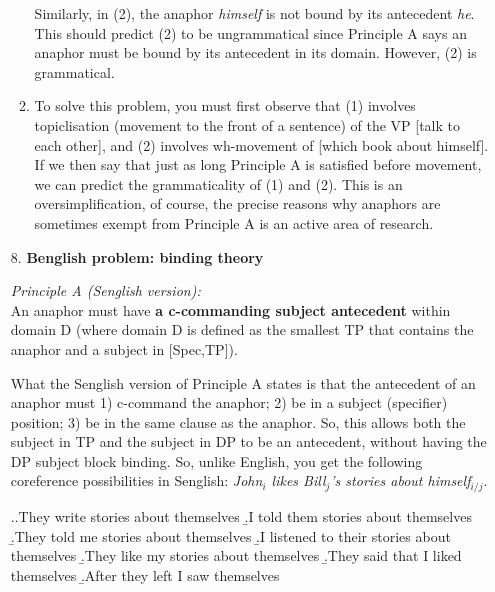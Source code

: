 \documentclass[a4paper,12pt]{article}
\begin{document}
\begin{enumerate}
\begin{enumerate}[label=(\roman*)]
        Similarly, in (2), the anaphor \textit{himself} is not bound by its antecedent \textit{he}. This should predict (2) to be ungrammatical since Principle A says an anaphor must be bound by its antecedent in its domain. However, (2) is grammatical.

        \item To solve this problem, you must first observe that (1) involves topiclisation (movement to the front of a sentence) of the VP [talk to each other], and (2) involves wh-movement of [which book about himself]. If we then say that just as long Principle A is satisfied before movement, we can predict the grammaticality of (1) and (2). This is an oversimplification, of course, the precise reasons why anaphors are sometimes exempt from Principle A is an active area of research.
        \end{enumerate}

    \item[8.]\textbf{Benglish problem: binding theory}
    \setcounter{ExNo}{0}
    	
		\textit{Principle A (Senglish version):}\\
        An anaphor must have \textbf{a c-commanding subject antecedent} within domain D (where domain D is defined as the smallest TP that contains the anaphor and a subject in [Spec,TP]).

      What the Senglish version of Principle A states is that the antecedent of an anaphor must 1) c-command the anaphor; 2) be in a subject (specifier) position; 3) be in the same clause as the anaphor. So, this allows both the subject in TP and the subject in DP to be an antecedent, without having the DP subject block binding. So, unlike English, you get the following coreference possibilities in Senglish: \textit{John$_i$ likes Bill$_j$'s stories about himself$_{i/j}$}.
		
        \ex.\a.They write stories about themselves
        	\b.I told them stories about themselves
            \b.They told me stories about themselves
            \b.I listened to their stories about themselves
            \b.They like my stories about themselves
            \b.They said that I liked themselves
            \b.After they left I saw themselves


\end{enumerate}
\end{document}
